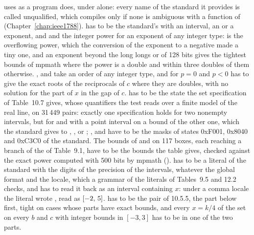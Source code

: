 \medskip
{} uses  as a program does, under
 alone: every name of the standard it
provides is called unqualified, which compiles only if none is ambiguous
with a function of  (Chapter~\ref{chap:ieee1788}).
 has to be the standard's with an interval, an  or a
 exponent, and  and  the integer
power for an exponent of any integer type:\newinvfive{}
 is the overflowing power, which the
conversion of the exponent to a negative  made a tiny one, and an
exponent beyond the long longs or of 128 bits gives the tightest bounds of
mpmath where the power is a double and within three doubles of them
otherwise. ,  and 
take an order of any integer type, and  for $p=0$ and
$p<0$ has to give the exact roots of the reciprocals of $c$ where they are
doubles, with no solution for the part of $x$ in the gap of $c$.
\newinvfive{} has to be the state the set specification
of Table~10.7 gives, whose quantifiers the test reads over a finite model of
the real line, on 31\,449 pairs: exactly one specification holds for two
nonempty intervals, but for  and  with a point
interval on a bound of the other one, which the standard gives to
, ,  or ;
,  and  have to be the masks of
states 0xF001, 0x8040 and 0xC3C0 of the standard. The bounds of
 and  on 117 boxes, each reaching
a branch of the  of Table~9.1, have to be the bounds the table
gives, checked against the exact power computed with 500 bits by mpmath
().  has to be a
literal of the standard with the digits of the precision of the intervals,
whatever the global format and the locale, which a grammar of the literals
of Tables~9.5 and 12.2 checks, and  has to read it back
as an interval containing $x$: under a comma locale the literal
\code{[a]} wrote \code{[-2,5]}, read as $[-2,\,5]$.\newinvfive{}
 has to be the pair of 10.5.5, the part below
first, tight on cases whose parts have exact bounds, and every $x=k/4$ of
the set on every $b$ and $c$ with integer bounds in $[-3, 3]$ has to be in
one of the two parts.\newinvfive

